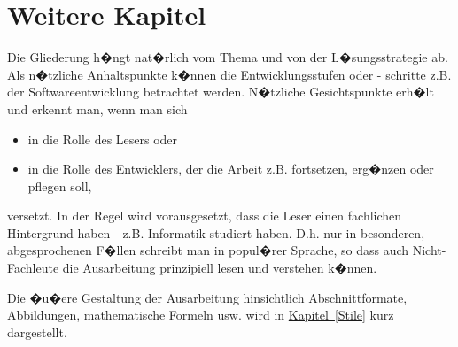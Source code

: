 \chapter{Weitere Kapitel}

Die Gliederung h�ngt nat�rlich vom Thema und von der L�sungsstrategie ab. Als n�tzliche
Anhaltspunkte k�nnen die Entwicklungsstufen oder - schritte z.B. der Softwareentwicklung betrachtet werden. N�tzliche Gesichtspunkte erh�lt und erkennt man, wenn man sich
\begin{itemize}
  \item in die Rolle des Lesers oder
  \item in die Rolle des Entwicklers, der die Arbeit z.B. fortsetzen, erg�nzen oder pflegen soll,
\end{itemize}
versetzt. In der Regel wird vorausgesetzt, dass die Leser einen fachlichen Hintergrund haben - z.B. Informatik studiert haben. D.h. nur in besonderen, abgesprochenen F�llen schreibt man in popul�rer Sprache, so dass auch Nicht-Fachleute die Ausarbeitung prinzipiell lesen und verstehen k�nnen.

Die �u�ere Gestaltung der Ausarbeitung hinsichtlich Abschnittformate, Abbildungen, mathematische Formeln usw. wird in \hyperref[Stile]{Kapitel~\ref*{Stile}} kurz dargestellt.